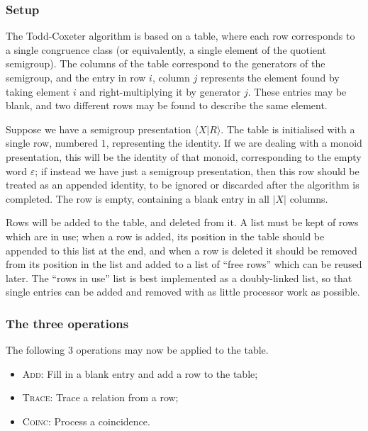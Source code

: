 \subsubsection{Setup}

The Todd-Coxeter algorithm is based on a table, where each row corresponds to a
single congruence class (or equivalently, a single element of the quotient
semigroup).  The columns of the table correspond to the generators of the
semigroup, and the entry in row $i$, column $j$ represents the element found by
taking element $i$ and right-multiplying it by generator $j$.  These entries may
be blank, and two different rows may be found to describe the same element.

Suppose we have a semigroup presentation $\langle X | R \rangle$.  The table is
initialised with a single row, numbered $1$, representing the identity.  If we
are dealing with a monoid presentation, this will be the identity of that
monoid, corresponding to the empty word $\varepsilon$; if instead we have just a
semigroup presentation, then this row should be treated as an appended identity,
to be ignored or discarded after the algorithm is completed.  The row is empty,
containing a blank entry in all $|X|$ columns.

Rows will be added to the table, and deleted from it.  A list must be kept of
rows which are in use; when a row is added, its position in the table should be
appended to this list at the end, and when a row is deleted it should be removed
from its position in the list and added to a list of ``free rows'' which can be
reused later.  The ``rows in use'' list is best implemented as a doubly-linked
list, so that single entries can be added and removed with as little processor
work as possible.

\subsubsection{The three operations}

The following 3 operations may now be applied to the table.

\begin{itemize}
\item \textsc{Add}: Fill in a blank entry and add a row to the table;
\item \textsc{Trace}: Trace a relation from a row;
\item \textsc{Coinc}: Process a coincidence.
\end{itemize}

